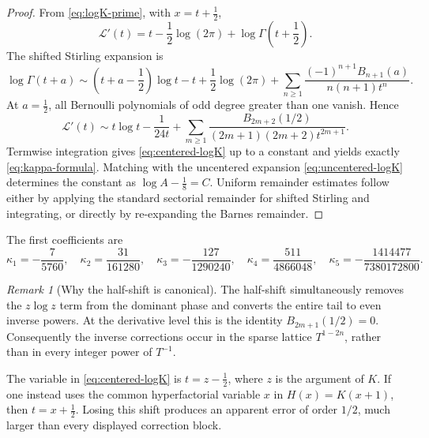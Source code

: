 \documentclass[11pt,oneside]{article}
\theoremstyle{plain}
\theoremstyle{definition}
\theoremstyle{remark}
\newtheorem{remark}[theorem]{Remark}
\newcommand{\Lcal}{\mathcal{L}}
\begin{document}
\begin{proof}
From \cref{eq:logK-prime}, with \(x=t+\tfrac12\),
\begin{equation}
 \Lcal'(t)=t-\frac12\log(2\pi)+\log\Gamma\!\left(t+\frac12\right).
 \label{eq:Lprime-gamma}
\end{equation}
The shifted Stirling expansion is
\begin{equation}
 \log\Gamma(t+a)
 \sim \left(t+a-\frac12\right)\log t-t+\frac12\log(2\pi)
 +\sum_{n\ge1}
   \frac{(-1)^{n+1}B_{n+1}(a)}{n(n+1)t^n}.
 \label{eq:shifted-Stirling}
\end{equation}
At \(a=\tfrac12\), all Bernoulli polynomials of odd degree greater than one
vanish.  Hence
\begin{equation}
 \Lcal'(t)
 \sim t\log t-\frac1{24t}
 +\sum_{m\ge1}
 \frac{B_{2m+2}(1/2)}{(2m+1)(2m+2)t^{2m+1}}.
 \label{eq:centered-derivative-expansion}
\end{equation}
Termwise integration gives \cref{eq:centered-logK} up to a constant and yields
exactly \cref{eq:kappa-formula}.  Matching with the uncentered expansion
\cref{eq:uncentered-logK} determines the constant as
\(\log A-\tfrac18=C\).  Uniform remainder estimates follow either by applying
the standard sectorial remainder for shifted Stirling and integrating, or
directly by re-expanding the Barnes remainder.
\end{proof}

The first coefficients are
\begin{equation}
 \kappa_1=-\frac7{5760},\quad
 \kappa_2=\frac{31}{161280},\quad
 \kappa_3=-\frac{127}{1290240},\quad
 \kappa_4=\frac{511}{4866048},\quad
 \kappa_5=-\frac{1414477}{7380172800}.
 \label{eq:kappa-first-five}
\end{equation}

\begin{remark}[Why the half-shift is canonical]
The half-shift simultaneously removes the \(z\log z\) term from the dominant
phase and converts the entire tail to even inverse powers.  At the derivative
level this is the identity \(B_{2m+1}(1/2)=0\).  Consequently the inverse
corrections occur in the sparse lattice \(T^{1-2n}\), rather than in every
integer power of \(T^{-1}\).
\end{remark}

\begin{warningbox}
The variable in \cref{eq:centered-logK} is
\(t=z-\tfrac12\), where \(z\) is the argument of \(K\).  If one instead uses
the common hyperfactorial variable \(x\) in \(H(x)=K(x+1)\), then
\(t=x+\tfrac12\).  Losing this shift produces an apparent error of order
\(1/2\), much larger than every displayed correction block.
\end{warningbox}
\end{document}
